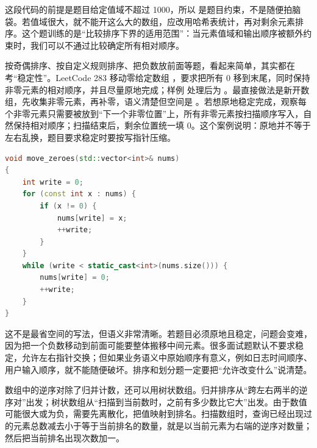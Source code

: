 这段代码的前提是题目给定值域不超过 1000，所以  是题目约束，不是随便拍脑袋。若值域很大，就不能开这么大的数组，应改用哈希表统计，再对剩余元素排序。这个题训练的是“比较排序下界的适用范围”：当元素值域和输出顺序被额外约束时，我们可以不通过比较确定所有相对顺序。

按奇偶排序、按自定义规则排序、把负数放前面等题，看起来简单，其实都在考“稳定性”。LeetCode 283 移动零给定数组 ，要求把所有 0 移到末尾，同时保持非零元素的相对顺序，并且尽量原地完成；样例 \code{[0,1,0,3,12]} 处理后为 \code{[1,3,12,0,0]}。最直接做法是新开数组，先收集非零元素，再补零，语义清楚但空间是 。若想原地稳定完成，观察每个非零元素只需要被放到“下一个非零位置”上，所有非零元素按扫描顺序写入，自然保持相对顺序；扫描结束后，剩余位置统一填 0。这个案例说明：原地并不等于左右乱换，题目要求稳定时要按写指针压缩。

\begin{lstlisting}[language=C++,caption={LeetCode 283 移动零：写指针保持非零元素顺序}]
void move_zeroes(std::vector<int>& nums)
{
    int write = 0;
    for (const int x : nums) {
        if (x != 0) {
            nums[write] = x;
            ++write;
        }
    }
    while (write < static_cast<int>(nums.size())) {
        nums[write] = 0;
        ++write;
    }
}
\end{lstlisting}

这不是最省空间的写法，但语义非常清晰。若题目必须原地且稳定，问题会变难，因为把一个负数移动到前面可能要整体搬移中间元素。很多面试题默认不要求稳定，允许左右指针交换；但如果业务语义中原始顺序有意义，例如日志时间顺序、用户输入顺序，就不能随便破坏。排序和划分题一定要把“允许改变什么”说清楚。

数组中的逆序对除了归并计数，还可以用树状数组。归并排序从“跨左右两半的逆序对”出发；树状数组从“扫描到当前数时，之前有多少数比它大”出发。由于数值可能很大或为负，需要先离散化，把值映射到排名。扫描数组时，查询已经出现过的元素总数减去小于等于当前排名的数量，就是以当前元素为右端的逆序对数量；然后把当前排名出现次数加一。

